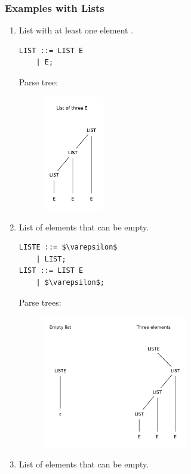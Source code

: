\subsubsection{Examples with Lists}
\begin{enumerate}
    \item
    List with at least one element .
    \begin{lstlisting}
LIST ::= LIST E
    | E;
    \end{lstlisting}
    Parse tree:
    \begin{figure}[H]
        \centerline{\includegraphics[width=0.25\textwidth]{img/27.pdf}}
    \end{figure}
    \item
    List of elements that can be empty.
    \begin{lstlisting}[mathescape]
LISTE ::= $\varepsilon$
    | LIST;
LIST ::= LIST E
    | $\varepsilon$;
    \end{lstlisting}
    Parse trees:
    \begin{figure}[H]
        \centerline{\includegraphics[width=0.6\textwidth]{img/28.pdf}}
    \end{figure}
    \item
    List of elements that can be empty.

\end{enumerate}
